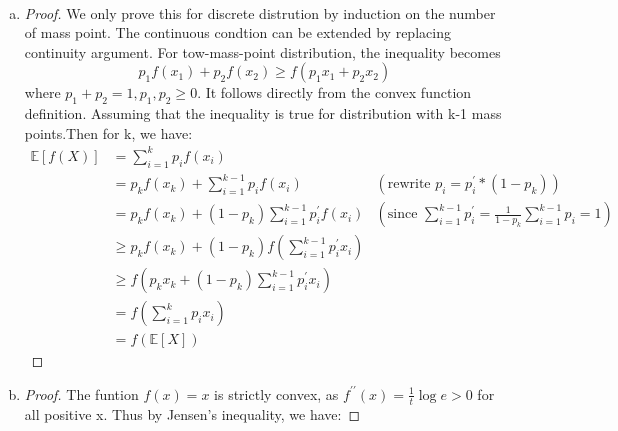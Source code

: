 \documentclass[12pt]{article}
\newenvironment{solution}[2][Solution]{\begin{trivlist}
\item[\hskip \labelsep {\bfseries #1}\hskip \labelsep {\bfseries #2.}]}{\end{trivlist}}
\begin{document}
\begin{solution}{6}
    ~
    \begin{enumerate}[(a)]
        \item \begin{proof}
            We only prove this for discrete distrution by induction on the number
            of mass point. The continuous condtion can be extended by replacing
            continuity argument. For tow-mass-point distribution, the inequality becomes
            \[p_1f(x_1) + p_2f(x_2) \ge f(p_1x_1+p_2x_2)\]
            where $p_1+p_2=1, p_1,p_2 \ge 0$. It follows directly from the convex
            function definition.
            Assuming that the inequality is true for distribution with k-1 mass points.Then
            for k, we have:
            \begin{align*}
                \mathbb{E}[f(X)] & = \sum_{i=1}^{k}p_if(x_i)                                                                                                                  \\
                                 & = p_kf(x_k)+\sum_{i=1}^{k-1}p_if(x_i)                   & (\text{rewrite $p_i=p_i^{\prime}*(1-p_k)$})                                      \\
                                 & = p_kf(x_k)+(1-p_k)\sum_{i=1}^{k-1}p_i^{\prime}f(x_i)   & (\text{since $\sum_{i=1}^{k-1}p_i^{\prime}=\frac1{1-p_k}\sum_{i=1}^{k-1}p_i$}=1) \\
                                 & \ge p_kf(x_k)+(1-p_k)f(\sum_{i=1}^{k-1}p_i^{\prime}x_i)                                                                                    \\
                                 & \ge f(p_kx_k+(1-p_k)\sum_{i=1}^{k-1}p_i^{\prime}x_i)                                                                                       \\
                                 & = f(\sum_{i=1}^{k}p_ix_i)                                                                                                                  \\
                                 & = f(\mathbb{E}[X])
            \end{align*}
        \end{proof}
        \item \begin{proof}
            The funtion $f(x)=x$ is strictly convex, as $f^{\prime \prime}(x)=\frac1t\log e > 0$ for all positive x. 
            Thus by Jensen's inequality, we have:

\end{proof}
\end{enumerate}
\end{solution}
\end{document}
